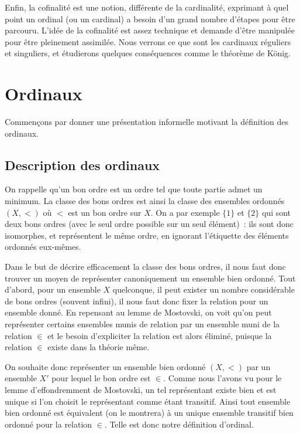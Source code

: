 Enfin, la cofinalité est une notion, différente de la cardinalité, exprimant à
quel point un ordinal (ou un cardinal) a besoin d'un grand nombre d'étapes pour
être parcouru. L'idée de la cofinalité est assez technique et demande d'être
manipulée pour être pleinement assimilée. Nous verrons ce que sont les cardinaux
réguliers et singuliers, et étudierons quelques conséquences comme le théorème
de König.

\section{Ordinaux}

Commençons par donner une présentation informelle motivant la définition des
ordinaux.

\subsection{Description des ordinaux}

On rappelle qu'un bon ordre est un ordre tel que toute partie admet un minimum.
La classe des bons ordres est ainsi la classe des ensembles ordonnés $(X,<)$
où $<$ est un bon ordre sur $X$. On a par exemple $\{1\}$ et $\{2\}$ qui sont
deux bons ordres (avec le seul ordre possible sur un seul élément)~: ils sont
donc isomorphes, et représentent le même ordre, en ignorant l'étiquette des
éléments ordonnés eux-mêmes.

Dans le but de décrire efficacement la classe des bons ordres, il nous faut donc
trouver un moyen de représenter canoniquement un ensemble bien ordonné. Tout
d'abord, pour un ensemble $X$ quelconque, il peut exister un nombre considérable
de bons ordres (souvent infini), il nous faut donc fixer la relation pour un
ensemble donné. En repensant au lemme de Mostovski, on voit qu'on peut
représenter certains ensembles munis de relation par un ensemble muni de la
relation $\in$ et le besoin d'expliciter la relation est alors éliminé, puisque
la relation $\in$ existe dans la théorie même.

On souhaite donc représenter un ensemble bien ordonné $(X,<)$ par un ensemble
$X'$ pour lequel le bon ordre est $\in$. Comme nous l'avons vu pour le lemme
d'effondremment de Mostovski, un tel représentant existe bien et est unique si
l'on choisit le représentant comme étant transitif. Ainsi tout ensemble bien
ordonné est équivalent (on le montrera) à un unique ensemble transitif bien
ordonné pour la relation $\in$. Telle est donc notre définition d'ordinal.

